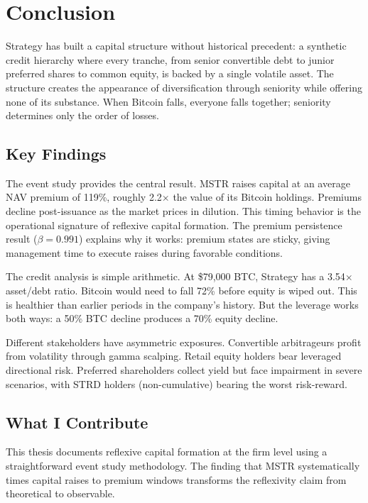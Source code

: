 \section{Conclusion}
\label{sec:conclusion}

Strategy has built a capital structure without historical precedent: a synthetic credit hierarchy where every tranche, from senior convertible debt to junior preferred shares to common equity, is backed by a single volatile asset. The structure creates the appearance of diversification through seniority while offering none of its substance. When Bitcoin falls, everyone falls together; seniority determines only the order of losses.

\subsection{Key Findings}

The event study provides the central result. MSTR raises capital at an average NAV premium of 119\%, roughly 2.2$\times$ the value of its Bitcoin holdings. Premiums decline post-issuance as the market prices in dilution. This timing behavior is the operational signature of reflexive capital formation. The premium persistence result ($\beta = 0.991$) explains why it works: premium states are sticky, giving management time to execute raises during favorable conditions.

The credit analysis is simple arithmetic. At \$79,000 BTC, Strategy has a 3.54$\times$ asset/debt ratio. Bitcoin would need to fall 72\% before equity is wiped out. This is healthier than earlier periods in the company's history. But the leverage works both ways: a 50\% BTC decline produces a 70\% equity decline.

Different stakeholders have asymmetric exposures. Convertible arbitrageurs profit from volatility through gamma scalping. Retail equity holders bear leveraged directional risk. Preferred shareholders collect yield but face impairment in severe scenarios, with STRD holders (non-cumulative) bearing the worst risk-reward.

\subsection{What I Contribute}

This thesis documents reflexive capital formation at the firm level using a straightforward event study methodology. The finding that MSTR systematically times capital raises to premium windows transforms the reflexivity claim from theoretical to observable.

